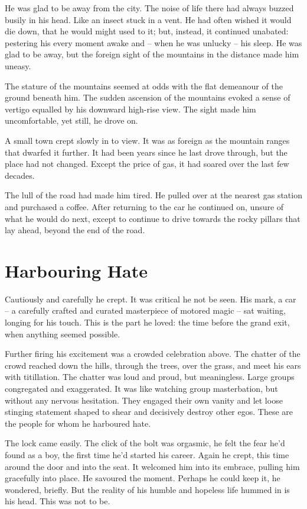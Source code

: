 \documentclass[fontsize=12pt,english]{scrreprt}
\begin{document}
He was glad to be away from the city. The noise of life there had
always buzzed busily in his head. Like an insect stuck in a vent. He
had often wished it would die down, that he would might used to it;
but, instead, it continued unabated: pestering his every moment awake
and -- when he was unlucky -- his sleep. He was glad to be away, but
the foreign sight of the mountains in the distance made him uneasy.

The stature of the mountains seemed at odds with the flat demeanour of
the ground beneath him. The sudden ascension of the mountains evoked a
sense of vertigo equalled by his downward high-rise view. The sight
made him uncomfortable, yet still, he drove on.

A small town crept slowly in to view. It was as foreign as the
mountain ranges that dwarfed it further. It had been years since he
last drove through, but the place had not changed. Except the price of
gas, it had soared over the last few decades.

The lull of the road had made him tired. He pulled over at the nearest
gas station and purchased a coffee. After returning to the car he
continued on, unsure of what he would do next, except to continue to
drive towards the rocky pillars that lay ahead, beyond the end of the
road.

\newpage

\section{Harbouring Hate}

Cautiously and carefully he crept. It was critical he not be seen. His
mark, a car -- a carefully crafted and curated masterpiece of motored
magic -- sat waiting, longing for his touch. This is the part he
loved: the time before the grand exit, when anything seemed
possible.

Further firing his excitement was a crowded celebration above. The
chatter of the crowd reached down the hills, through the trees, over
the grass, and meet his ears with titillation. The chatter was loud
and proud, but meaningless. Large groups congregated and
exaggerated. It was like watching group masterbation, but without any
nervous hesitation. They engaged their own vanity and let loose
stinging statement shaped to shear and decisively destroy other
egos. These are the people for whom he harboured hate.

The lock came easily. The click of the bolt was orgasmic, he felt the
fear he'd found as a boy, the first time he'd started his
career. Again he crept, this time around the door and into the
seat. It welcomed him into its embrace, pulling him gracefully into
place. He savoured the moment. Perhaps he could keep it, he wondered,
briefly. But the reality of his humble and hopeless life hummed in is
his head. This was not to be.
\end{document}
